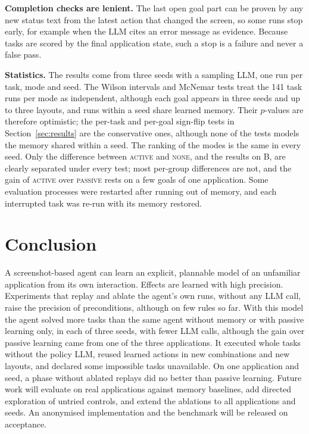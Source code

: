 \documentclass[conference]{IEEEtran}
\newcommand{\modeNone}{\textsc{none}}
\newcommand{\modePassive}{\textsc{passive}}
\newcommand{\modeActive}{\textsc{active}}
\begin{document}
\textbf{Completion checks are lenient.} The last open goal part can be proven by any new status text from the latest action that changed the screen, so some runs stop early, for example when the LLM cites an error message as evidence. Because tasks are scored by the final application state, such a stop is a failure and never a false pass.

\textbf{Statistics.} %
The results come from three seeds with a sampling LLM, one run per task, mode and seed. The Wilson intervals and McNemar tests treat the 141 task runs per mode as independent, although each goal appears in three seeds and up to three layouts, and runs within a seed share learned memory. Their $p$-values are therefore optimistic; the per-task and per-goal sign-flip tests in Section~\ref{sec:results} are the conservative ones, although none of the tests models the memory shared within a seed. The ranking of the modes is the same in every seed. Only the difference between \modeActive{} and \modeNone{}, and the results on B, are clearly separated under every test; most per-group differences are not, and the gain of \modeActive{} over \modePassive{} rests on a few goals of one application. Some evaluation processes were restarted after running out of memory, and each interrupted task was re-run with its memory restored.

\section{Conclusion}
A screenshot-based agent can learn an explicit, plannable model of an unfamiliar application from its own interaction. Effects are learned with high precision. Experiments that replay and ablate the agent's own runs, without any LLM call, raise the precision of preconditions, although on few rules so far. With this model the agent solved more tasks than the same agent without memory or with passive learning only, in each of three seeds, with fewer LLM calls, although the gain over passive learning came from one of the three applications. It executed whole tasks without the policy LLM, reused learned actions in new combinations and new layouts, and declared some impossible tasks unavailable. On one application and seed, a phase without ablated replays did no better than passive learning. Future work will evaluate on real applications against memory baselines, add directed exploration of untried controls, and extend the ablations to all applications and seeds. An anonymised implementation and the benchmark will be released on acceptance.



\end{document}
